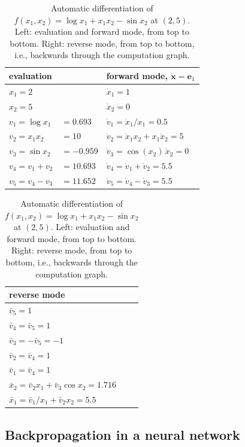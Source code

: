 \documentclass[11pt]{article}
\theoremstyle{definition}
\theoremstyle{plain}
\theoremstyle{remark}
\begin{document}
\begin{table}[ht]
    \centering
    \renewcommand{\arraystretch}{1.3}
    \begin{tabular}{lll}
        \hline
        evaluation & & forward mode, $\dot{\mathbf{x}} = \mathbf{e}_1$ \\
        \hline
        $x_1 = 2$ & & $\dot x_1 = 1$ \\
        $x_2 = 5$ & & $\dot x_2 = 0$ \\
        $v_1 = \log x_1$ & $= 0.693$ & $\dot v_1 = \dot x_1 / x_1 = 0.5$ \\
        $v_2 = x_1 x_2$ & $= 10$ & $\dot v_2 = \dot x_1 x_2 + x_1 \dot x_2 = 5$ \\
        $v_3 = \sin x_2$ & $= -0.959$ & $\dot v_3 = \cos(x_2)\, \dot x_2 = 0$ \\
        $v_4 = v_1 + v_2$ & $= 10.693$ & $\dot v_4 = \dot v_1 + \dot v_2 = 5.5$ \\
        $v_5 = v_4 - v_3$ & $= 11.652$ & $\dot v_5 = \dot v_4 - \dot v_3 = 5.5$ \\
        \hline
    \end{tabular}
    \qquad
    \begin{tabular}{l}
        \hline
        reverse mode \\
        \hline
        $\bar v_5 = 1$ \\
        $\bar v_4 = \bar v_5 = 1$ \\
        $\bar v_3 = -\bar v_5 = -1$ \\
        $\bar v_2 = \bar v_4 = 1$ \\
        $\bar v_1 = \bar v_4 = 1$ \\
        $\bar x_2 = \bar v_2 x_1 + \bar v_3 \cos x_2 = 1.716$ \\
        $\bar x_1 = \bar v_1 / x_1 + \bar v_2 x_2 = 5.5$ \\
        \hline
    \end{tabular}
    \caption{Automatic differentiation of $f(x_1, x_2) = \log x_1 + x_1 x_2 - \sin x_2$ at $(2, 5)$. Left: evaluation and forward mode, from top to bottom. Right: reverse mode, from top to bottom, i.e., backwards through the computation graph.}
    \label{tab:autodiff}
\end{table}

\subsection{Backpropagation in a neural network}
\end{document}
